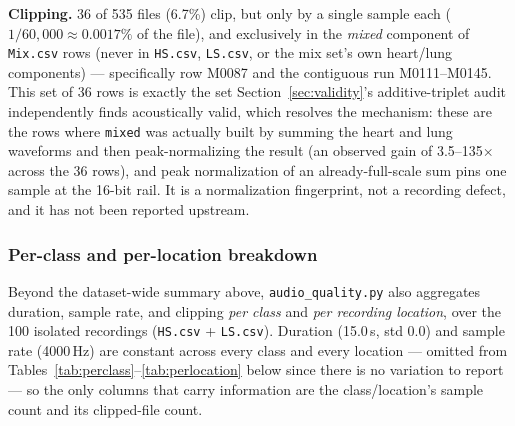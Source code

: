 \documentclass[11pt]{article}
\begin{document}
\textbf{Clipping.} 36 of 535 files (6.7\%) clip, but only by a single sample
each ($1/60{,}000 \approx 0.0017\%$ of the file), and exclusively in the
\emph{mixed} component of \texttt{Mix.csv} rows (never in \texttt{HS.csv},
\texttt{LS.csv}, or the mix set's own heart/lung components) --- specifically
row M0087 and the contiguous run M0111--M0145. This set of 36 rows is exactly
the set Section~\ref{sec:validity}'s additive-triplet audit independently
finds acoustically valid, which resolves the mechanism: these are the rows
where \texttt{mixed} was actually built by summing the heart and lung
waveforms and then peak-normalizing the result (an observed gain of
3.5--135$\times$ across the 36 rows), and peak normalization of an
already-full-scale sum pins one sample at the 16-bit rail. It is a
normalization fingerprint, not a recording defect, and it has not been
reported upstream.

\subsubsection{Per-class and per-location breakdown}
\label{sec:perclass}

Beyond the dataset-wide summary above, \texttt{audio\_quality.py} also
aggregates duration, sample rate, and clipping \emph{per class} and \emph{per
recording location}, over the 100 isolated recordings (\texttt{HS.csv} +
\texttt{LS.csv}). Duration (15.0\,s, std 0.0) and sample rate (4000\,Hz) are
constant across every class and every location --- omitted from
Tables~\ref{tab:perclass}--\ref{tab:perlocation} below since there is no
variation to report --- so the only columns that carry information are the
class/location's sample count and its clipped-file count.
\end{document}
